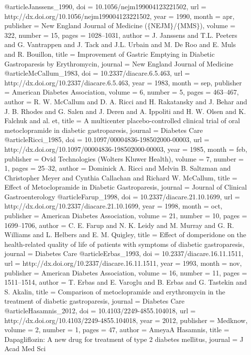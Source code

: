 @article{Janssens_1990,
	doi = {10.1056/nejm199004123221502},
	url = {http://dx.doi.org/10.1056/nejm199004123221502},
	year = 1990,
	month = {apr},
	publisher = {New England Journal of Medicine ($\lbrace$NEJM$\rbrace$/$\lbrace$MMS$\rbrace$)},
	volume = {322},
	number = {15},
	pages = {1028--1031},
	author = {J. Janssens and T.L. Peeters and G. Vantrappen and J. Tack and J.L. Urbain and M. De Roo and E. Muls and R. Bouillon},
	title = {Improvement of Gastric Emptying in Diabetic Gastroparesis by Erythromycin},
	journal = {New England Journal of Medicine}
}
@article{McCallum_1983,
	doi = {10.2337/diacare.6.5.463},
	url = {http://dx.doi.org/10.2337/diacare.6.5.463},
	year = 1983,
	month = {sep},
	publisher = {American Diabetes Association},
	volume = {6},
	number = {5},
	pages = {463--467},
	author = {R. W. McCallum and D. A. Ricci and H. Rakatansky and J. Behar and J. B. Rhodes and G. Salen and J. Deren and A. Ippoliti and H. W. Olsen and K. Falchuk and al. et},
	title = {A multicenter placebo-controlled clinical trial of oral metoclopramide in diabetic gastroparesis},
	journal = {Diabetes Care}
}
@article{Ricci_1985,
	doi = {10.1097/00004836-198502000-00003},
	url = {http://dx.doi.org/10.1097/00004836-198502000-00003},
	year = 1985,
	month = {feb},
	publisher = {Ovid Technologies (Wolters Kluwer Health)},
	volume = {7},
	number = {1},
	pages = {25--32},
	author = {Dominick A. Ricci and Melvin B. Saltzman and Christopher Meyer and Cynthia Callachan and Richard W. McCallum},
	title = {Effect of Metoclopramide in Diabetic Gastroparesis},
	journal = {Journal of Clinical Gastroenterology}
}
@article{Farup_1998,
	doi = {10.2337/diacare.21.10.1699},
	url = {http://dx.doi.org/10.2337/diacare.21.10.1699},
	year = 1998,
	month = {oct},
	publisher = {American Diabetes Association},
	volume = {21},
	number = {10},
	pages = {1699--1706},
	author = {C. E. Farup and N. K. Leidy and M. Murray and G. R. Williams and L. Helbers and E. M. Quigley},
	title = {Effect of domperidone on the health-related quality of life of patients with symptoms of diabetic gastroparesis},
	journal = {Diabetes Care}
}
@article{Erbas_1993,
	doi = {10.2337/diacare.16.11.1511},
	url = {http://dx.doi.org/10.2337/diacare.16.11.1511},
	year = 1993,
	month = {nov},
	publisher = {American Diabetes Association},
	volume = {16},
	number = {11},
	pages = {1511--1514},
	author = {T. Erbas and E. Varoglu and B. Erbas and G. Tastekin and S. Akalin},
	title = {Comparison of metoclopramide and erythromycin in the treatment of diabetic gastroparesis},
	journal = {Diabetes Care}
}
@article{Hasamnis_2012,
	doi = {10.4103/2249-4855.104018},
	url = {http://dx.doi.org/10.4103/2249-4855.104018},
	year = 2012,
	publisher = {Medknow},
	volume = {2},
	number = {1},
	pages = {47},
	author = {AmeyaA Hasamnis},
	title = {Dapagliflozin: A new drug for treatment of type 2 diabetes mellitus},
	journal = {J Acad Med Sci}
}
